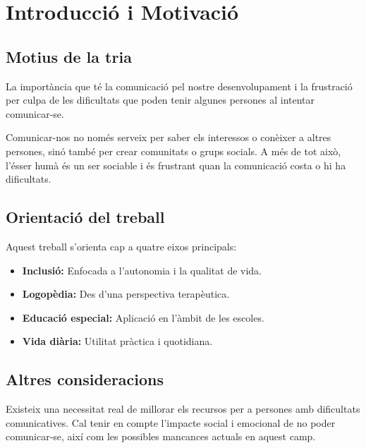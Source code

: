 \chapter{Introducció i Motivació}
\thispagestyle{fancy}

\section{Motius de la tria}
La importància que té la comunicació pel nostre desenvolupament i la frustració per culpa de les dificultats que poden tenir algunes persones al intentar comunicar-se.

Comunicar-nos no només serveix per saber els interessos o conèixer a altres persones, sinó també per crear comunitats o grups socials. A més de tot això, l'ésser humà és un ser sociable i és frustrant quan la comunicació costa o hi ha dificultats.

\section{Orientació del treball}
Aquest treball s'orienta cap a quatre eixos principals:
\begin{itemize}
    \item \textbf{Inclusió:} Enfocada a l'autonomia i la qualitat de vida.
    \item \textbf{Logopèdia:} Des d'una perspectiva terapèutica.
    \item \textbf{Educació especial:} Aplicació en l'àmbit de les escoles.
    \item \textbf{Vida diària:} Utilitat pràctica i quotidiana.
\end{itemize}

\section{Altres consideracions}
Existeix una necessitat real de millorar els recursos per a persones amb dificultats comunicatives. Cal tenir en compte l'impacte social i emocional de no poder comunicar-se, així com les possibles mancances actuals en aquest camp.
